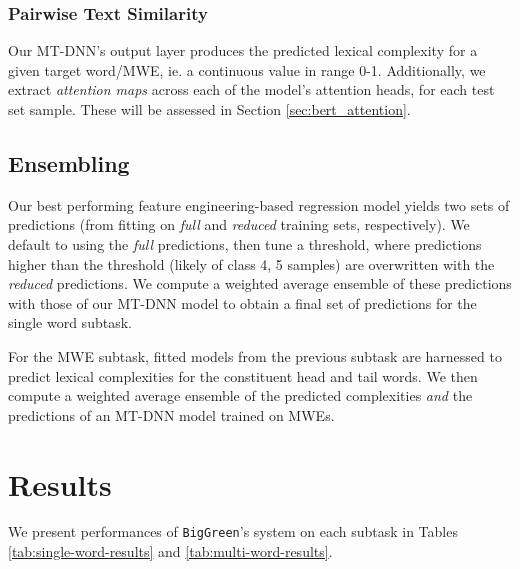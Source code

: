 \documentclass{dcthesis}
\theoremstyle{definition}
\theoremstyle{remark}
\begin{document}
\subsection{Pairwise Text Similarity}

Our MT-DNN's output layer produces the predicted lexical complexity for a given target word/MWE, ie. a continuous value in range 0-1. Additionally, we extract \textit{attention maps} across each of the model's attention heads, for each test set sample. These will be assessed in Section \ref{sec:bert_attention}.

\section{Ensembling}

Our best performing feature engineering-based regression model yields two sets of predictions (from fitting on \textit{full} and \textit{reduced} training sets, respectively). We default to using the \textit{full} predictions, then tune a threshold, where predictions higher than the threshold (likely of class 4, 5 samples) are overwritten with the \textit{reduced} predictions. We compute a weighted average ensemble of these predictions with those of our MT-DNN model to obtain a final set of predictions for the single word subtask. 

For the MWE subtask, fitted models from the previous subtask are harnessed to predict lexical complexities for the constituent head and tail words. We then compute a weighted average ensemble of the predicted complexities \textit{and} the predictions of an MT-DNN model trained on MWEs.

\chapter{Results}

\vspace*{-\baselineskip}

We present performances of \texttt{BigGreen}'s system on each subtask in Tables \ref{tab:single-word-results} and \ref{tab:multi-word-results}.
\end{document}
